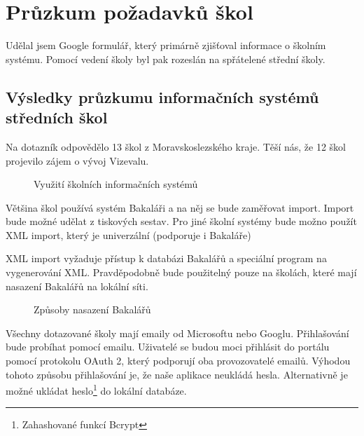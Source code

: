 \section{Průzkum požadavků škol}
Udělal jsem Google formulář, který primárně zjišťoval informace o školním systému.  Pomocí vedení školy byl pak rozeslán na spřátelené střední školy. 
\subsection{Výsledky průzkumu informačních systémů středních škol}
Na dotazník odpovědělo 13 škol z Moravskoslezského kraje. Těší nás, že 12 škol projevilo zájem o vývoj Vizevalu.

\begin{figure}[H]
    \centering
    \caption{Využití školních informačních systémů}
    \label{fig:vyuziti-skolnich-systemu}
\end{figure}

Většina škol používá systém Bakaláři a na něj se bude zaměřovat import. Import bude možné udělat z tiskových sestav. Pro jiné školní systémy bude možno použít XML import, který je univerzální (podporuje i Bakaláře)




XML import vyžaduje přístup k databázi Bakalářů a speciální program na vygenerování XML. Pravděpodobně bude použitelný pouze na školách, které mají nasazení Bakalářů na lokální síti. 

\begin{figure}[H]
    \centering

    \caption{Způsoby nasazení Bakalářů}
    \label{fig:poskytovatele-emailu}
\end{figure}

Všechny dotazované školy mají emaily od Microsoftu nebo Googlu.
Přihlašování bude probíhat pomocí emailu.
Uživatelé se budou moci přihlásit do portálu pomocí protokolu OAuth 2, který podporují oba provozovatelé emailů.
Výhodou tohoto způsobu přihlašování je, že naše aplikace neukládá hesla.
Alternativně je možné ukládat heslo\footnote{Zahashované funkcí Bcrypt} do lokální databáze.



